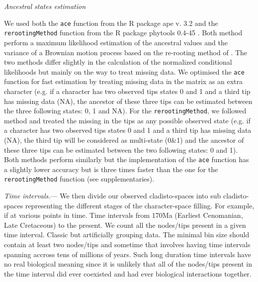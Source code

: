 \documentclass[12pt,letterpaper]{article}
\renewcommand{\subsection}[1]{%
\bigskip
\begin{center}
\begin{large}
\normalfont\itshape #1
\end{large}
\end{center}}
\renewcommand{\subsubsection}[1]{%
\vspace{2ex}
\noindent
\textit{#1.}---}
\begin{document}
\subsection{Ancestral states estimation}
We used both the \texttt{ace} function from the R package ape v. 3.2 \cite{paradisape:2004} and the 
\texttt{rerootingMethod} function from the R package phytools 0.4-45 \cite{phytools}. Both method perform a maximum likelihood estimation of the ancestral values and the variance of a Brownian motion process based on the re-rooting method of \cite{Yang01121995}. The two methods differ slightly in the calculation of the normalized conditional likelihoods but mainly on the way to treat missing data. We optimised the \texttt{ace} function for fast estimation by treating missing data in the matrix as an extra character (e.g. if a character has two observed tips states 0 and 1 and a third tip has missing data (NA), the ancestor of these three tips can be estimated between the three following states: 0, 1 and NA). For the \texttt{rerootingMethod}, we followed \cite{Claddis} method and treated the missing in the tips as any possible observed state (e.g. if a character has two observed tips states 0 and 1 and a third tip has missing data (NA), the third tip will be considered as multi-state (0\&1) and the ancestor of these three tips can be estimated between the two following states: 0 and 1). Both methods perform similarly but the implementation of the \texttt{ace} function has a slightly lower accuracy  but is three times faster than the one for the \texttt{rerootingMethod} function (see supplementaries).

\subsubsection{Time intervals}
We then divide our observed cladisto-spaces into sub cladisto-spaces representing the different stages of the character-space filling. For example, if at various points in time.
Time intervals from 170Ma (Earliest Cenomanian, Late Cretaceous) to the present.
We count all the nodes/tips present in a given time interval.
Classic but artificially grouping data. The minimal bin size should contain at least two nodes/tips and sometime that involves having time intervals spanning accross tens of millions of years. Such long duration time intervals have no real biological meaning since it is unlikely that all of the nodes/tips present in the time interval did ever coexisted and had ever biological interactions together.
\end{document}
